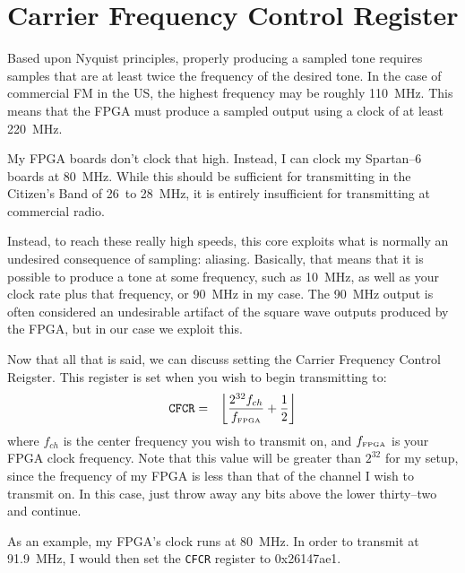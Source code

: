 \documentclass{gqtekspec}
\begin{document}
\section{Carrier Frequency Control Register}
Based upon Nyquist principles, properly producing a sampled tone requires 
samples that are at least twice the frequency of the desired tone.  In the
case of commercial FM in the US, the highest frequency may be roughly 110~MHz.
This means that the FPGA must produce a sampled output using a clock of at
least 220~MHz.  

My FPGA boards don't clock that high.  Instead, I can clock my Spartan--6 boards
at 80~MHz.  While this should be sufficient for transmitting in the Citizen's
Band of 26~to 28~MHz, it is entirely insufficient for transmitting at commercial
radio.

Instead, to reach these really high speeds, this core exploits what
is normally an undesired consequence of sampling: aliasing.  Basically, that 
means that it is possible to produce a tone at some frequency, such as 10~MHz,
as well as your clock rate plus that frequency, or 90~MHz in my case.  The 
90~MHz output is often considered an undesirable artifact of the square wave
outputs produced by the FPGA, but in our case we exploit this.

Now that all that is said, we can discuss setting the Carrier Frequency
Control Reigster.  This register is set when you wish to begin transmitting
to:
\begin{eqnarray}
{\tt CFCR} &=& \left\lfloor \frac{2^{32} f_{ch}}{f_{\mbox{\tiny FPGA}}}
		+\frac{1}{2}\right\rfloor
\end{eqnarray}
where $f_{ch}$ is the center frequency you wish to transmit on, and
$f_{\mbox{\tiny FPGA}}$ is your FPGA clock frequency.  Note that this value
will be greater than $2^{32}$ for my setup, since the frequency of my FPGA
is less than that of the channel I wish to transmit on.  In this case, just
throw away any bits above the lower thirty--two and continue.

As an example, my FPGA's clock runs at 80~MHz.  In order to transmit at 
91.9~MHz, I would then set the {\tt CFCR} register to 
\hbox{0x26147ae1}.
\end{document}
